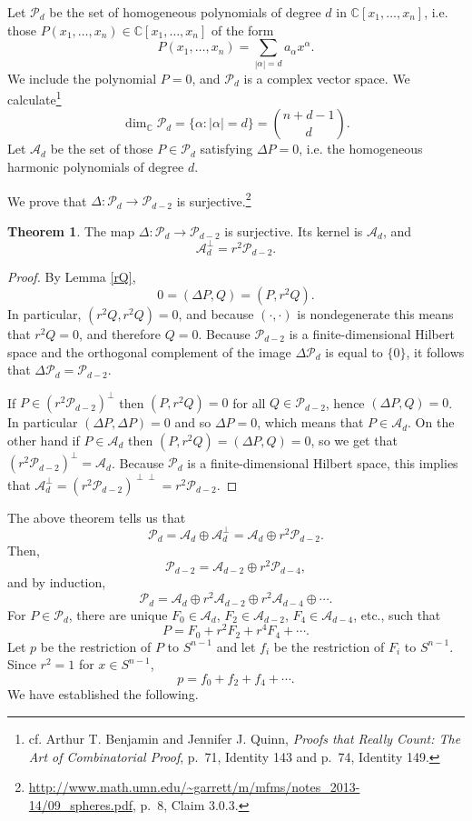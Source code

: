 \documentclass{article}
\theoremstyle{definition}
\newtheorem{theorem}{Theorem}
\theoremstyle{definition}
\begin{document}
Let $\mathscr{P}_d$ be  the set of homogeneous polynomials of degree $d$ in $\mathbb{C}[x_1,\ldots,x_n]$, 
i.e. those 
$P(x_1,\ldots,x_n) \in \mathbb{C}[x_1,\ldots,x_n]$
of the form
\[
P(x_1,\ldots,x_n) = \sum_{|\alpha|=d} a_\alpha x^\alpha.
\]
We include the polynomial $P=0$, and $\mathscr{P}_d$ is a complex vector space. We calculate\footnote{cf. Arthur T. Benjamin and Jennifer J. Quinn,
{\em Proofs that Really Count: The Art of Combinatorial Proof}, p.~71, Identity 143 and p.~74, Identity 149.}
\begin{equation}
\dim_\mathbb{C} \mathscr{P}_d = \{\alpha: |\alpha| = d\} = \binom{n+d-1}{d}.
\label{Pdimension}
\end{equation}
Let $\mathscr{A}_d$ be the set of those $P \in \mathscr{P}_d$ satisfying $\Delta P=0$, i.e. the homogeneous harmonic polynomials of degree $d$. 



We prove that $\Delta:\mathscr{P}_d \to \mathscr{P}_{d-2}$ is surjective.\footnote{\url{http://www.math.umn.edu/~garrett/m/mfms/notes_2013-14/09_spheres.pdf},
p.~8, Claim 3.0.3.}

\begin{theorem}
The map $\Delta:\mathscr{P}_d \to \mathscr{P}_{d-2}$ is surjective. Its kernel is
$\mathscr{A}_d$, and 
\[
\mathscr{A}_d^\perp = r^2 \mathscr{P}_{d-2}.
\]
\label{surjective}
\end{theorem}
\begin{proof}
By Lemma \ref{rQ},
\[
0=(\Delta P,Q) = (P,r^2Q).
\]
In particular, $(r^2Q,r^2Q)=0$, and because $(\cdot,\cdot)$ is nondegenerate this means that
$r^2Q=0$, and therefore $Q=0$. Because $\mathscr{P}_{d-2}$ is a finite-dimensional Hilbert space
and the orthogonal complement of the image $\Delta \mathscr{P}_d$ is equal to $\{0\}$, it follows
that $\Delta \mathscr{P}_d=\mathscr{P}_{d-2}$. 

If $P \in (r^2 \mathscr{P}_{d-2})^\perp$ then $(P,r^2Q)=0$ for all $Q \in \mathscr{P}_{d-2}$, hence
$(\Delta P,Q)=0$. In particular $(\Delta P,\Delta P)=0$ and so
$\Delta P=0$, which means that $P \in \mathscr{A}_d$.
 On the other hand if
 $P \in \mathscr{A}_d$ then 
$(P,r^2Q)=(\Delta P,Q)=0$, so we get that $(r^2 \mathscr{P}_{d-2})^\perp = \mathscr{A}_d$. 
Because $\mathscr{P}_d$ is a finite-dimensional Hilbert space, this implies that
$\mathscr{A}_d^\perp = (r^2 \mathscr{P}_{d-2})^{\perp \perp}=r^2 \mathscr{P}_{d-2}$. 
\end{proof}

The above theorem tells us that
\[
\mathscr{P}_d = \mathscr{A}_d \oplus \mathscr{A}_d^\perp 
= \mathscr{A}_d \oplus r^2 \mathscr{P}_{d-2}.
\]
Then,
\[
\mathscr{P}_{d-2} = \mathscr{A}_{d-2} \oplus r^2 \mathscr{P}_{d-4},
\]
and by induction,
\[
\mathscr{P}_d = \mathscr{A}_d \oplus r^2 \mathscr{A}_{d-2}
\oplus r^2 \mathscr{A}_{d-4} \oplus \cdots.
\]
For $P \in \mathscr{P}_d$, there are unique $F_0 \in \mathscr{A}_d$, $F_2 \in
\mathscr{A}_{d-2}$, $F_4 \in \mathscr{A}_{d-4}$, etc., such that
\[
P=F_0+r^2F_2+r^4F_4+\cdots. 
\]
Let $p$ be the restriction of $P$ to $S^{n-1}$ and let $f_i$ be the restriction of $F_i$ to $S^{n-1}$.
Since $r^2=1$ for $x \in S^{n-1}$,
\[
p = f_0 + f_2 + f_4 + \cdots.
\]
We have established the following.
\end{document}
